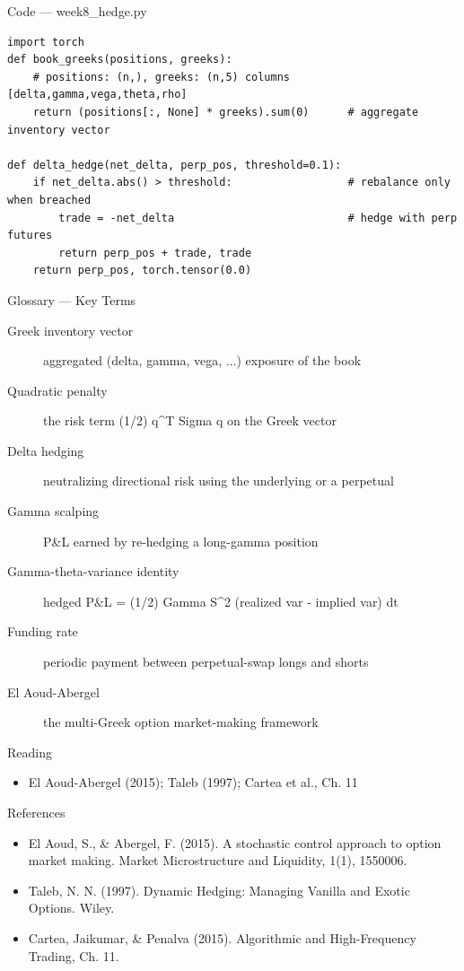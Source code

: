 \documentclass[aspectratio=169,10pt]{beamer}
\begin{document}
\begin{frame}[fragile]{Code --- week8\_hedge.py}
\begin{lstlisting}
import torch
def book_greeks(positions, greeks):
    # positions: (n,), greeks: (n,5) columns [delta,gamma,vega,theta,rho]
    return (positions[:, None] * greeks).sum(0)      # aggregate inventory vector

def delta_hedge(net_delta, perp_pos, threshold=0.1):
    if net_delta.abs() > threshold:                  # rebalance only when breached
        trade = -net_delta                           # hedge with perp futures
        return perp_pos + trade, trade
    return perp_pos, torch.tensor(0.0)
\end{lstlisting}
\end{frame}
\begin{frame}{Glossary --- Key Terms}
\footnotesize\begin{description}
\item[\color{ncsured}Greek inventory vector] aggregated (delta, gamma, vega, ...) exposure of the book
\item[\color{ncsured}Quadratic penalty] the risk term (1/2) q\textasciicircum{}T Sigma q on the Greek vector
\item[\color{ncsured}Delta hedging] neutralizing directional risk using the underlying or a perpetual
\item[\color{ncsured}Gamma scalping] P\&L earned by re-hedging a long-gamma position
\item[\color{ncsured}Gamma-theta-variance identity] hedged P\&L = (1/2) Gamma S\textasciicircum{}2 (realized var - implied var) dt
\item[\color{ncsured}Funding rate] periodic payment between perpetual-swap longs and shorts
\item[\color{ncsured}El Aoud-Abergel] the multi-Greek option market-making framework
\end{description}
\end{frame}

\begin{frame}{Reading}
\begin{itemize}
  \item El Aoud-Abergel (2015); Taleb (1997); Cartea et al., Ch. 11
\end{itemize}
\end{frame}

\begin{frame}{References}
\scriptsize\begin{itemize}\setlength{\itemsep}{3pt}
  \item El Aoud, S., \& Abergel, F. (2015). A stochastic control approach to option market making. Market Microstructure and Liquidity, 1(1), 1550006.
  \item Taleb, N. N. (1997). Dynamic Hedging: Managing Vanilla and Exotic Options. Wiley.
  \item Cartea, Jaikumar, \& Penalva (2015). Algorithmic and High-Frequency Trading, Ch. 11.
\end{itemize}
\end{frame}
\end{document}
